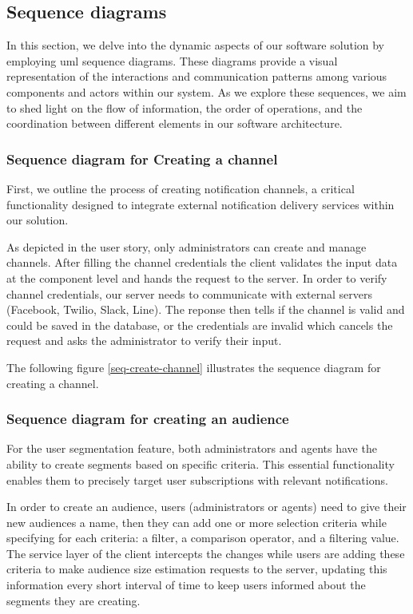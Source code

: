 \subsection{Sequence diagrams}
In this section, we delve into the dynamic aspects of our software solution by employing \acrshort{uml}
sequence diagrams. These diagrams provide a visual representation of the interactions and communication
patterns among various components and actors within our system. As we explore these sequences,
we aim to shed light on the flow of information, the order of operations, and the coordination
between different elements in our software architecture.


\subsubsection{Sequence diagram for Creating a channel}
First, we outline the process of creating notification channels, a critical functionality
designed to integrate external notification delivery services within our solution.

As depicted in the user story, only administrators can create and manage channels. After filling the channel
credentials the client validates the input data at the component level and hands the request to
the server. In order to verify channel credentials, our server needs to communicate with external servers (Facebook,
Twilio, Slack, Line). The reponse then tells if the channel is valid and could be saved in the database,
or the credentials are invalid which cancels the request and asks the administrator to verify their input.

\noindent The following figure \ref{seq-create-channel} illustrates the sequence diagram for creating a channel.

\subsubsection{Sequence diagram for creating an audience}
For the user segmentation feature, both administrators and agents have the ability to create segments
based on specific criteria.  This essential functionality enables them to precisely target user subscriptions
with relevant notifications.

In order to create an audience, users (administrators or agents) need to give their new audiences a name,
then they can add one or more selection criteria while specifying for each criteria: a filter, a comparison operator,
and a filtering value. The service layer of the client intercepts the changes while users are adding these criteria
to make audience size estimation requests to the server, updating this information every short interval of time
to keep users informed about the segments they are creating.

